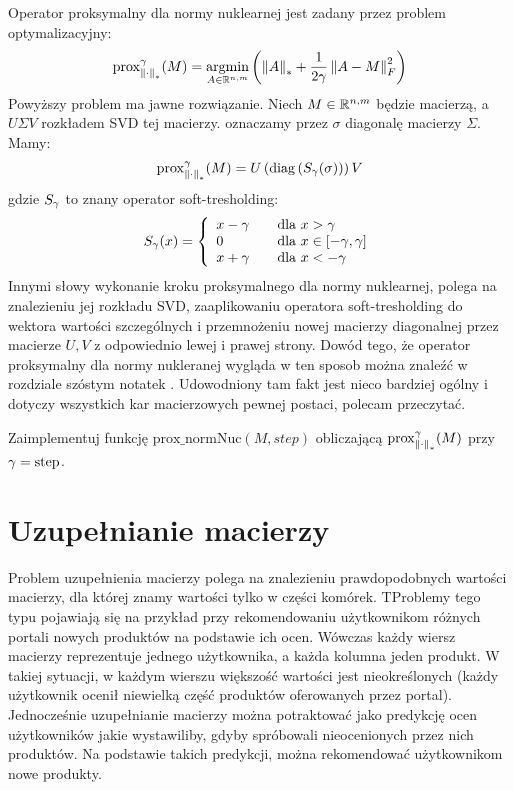 \documentclass[10pt,a4paper,draft]{report}
\begin{document}
Operator proksymalny dla normy nuklearnej jest zadany przez problem optymalizacyjny:
\[
\prox_{\normNuc{\cdot}}^{\step}(M) = \argminl\limits_{A \in \rset^{n,m}} \left(\normNuc{A} + \frac{1}{2\step} \norm{A - M}_F^2 \right)
\]
Powyższy problem ma jawne rozwiązanie. Niech $M \in \mathbb{R}^{n,m}$ będzie macierzą, a $U \Sigma V$ rozkładem SVD tej macierzy. oznaczamy przez $\sigma$ diagonalę macierzy $\Sigma$. Mamy:
\[
\operatorname{prox}_{\left\Vert \cdot \right\Vert_{*}}^{\gamma}(M) = U \left( \operatorname{diag} \left(S_{\gamma}(\sigma) \right) \right) V
\]
gdzie $S_{\gamma}$ to znany operator soft-tresholding:
\[
S_{\gamma}(x) = \left\{ 
\begin{array}{lcl}
x - \gamma && \text{dla } x > \gamma \\
0 &&  \text{dla } x \in [-\gamma, \gamma] \\
x + \gamma && \text{dla } x < -\gamma
\end{array}
\right.
\]
Innymi słowy wykonanie kroku proksymalnego dla normy nuklearnej, polega na znalezieniu jej rozkładu SVD, zaaplikowaniu operatora soft-tresholding do wektora wartości szczególnych i przemnożeniu nowej macierzy diagonalnej przez macierze $U,V$ z odpowiednio lewej i prawej strony. Dowód tego, że operator proksymalny dla normy nukleranej wygląda w ten sposob można znaleźć w rozdziale szóstym notatek \cite{notesMIT}. Udowodniony tam fakt jest nieco bardziej ogólny i dotyczy wszystkich kar macierzowych pewnej postaci, polecam przeczytać.


\begin{problem} \label{prob:prob1} 
Zaimplementuj funkcję $\text{prox\_normNuc}(M, step)$ obliczającą $\operatorname{prox}_{\left\Vert \cdot \right\Vert_{*}}^{\gamma}(M)$ przy $\gamma = \text{step}$.
\end{problem}

\newpage
\section*{Uzupełnianie macierzy}
Problem uzupełnienia macierzy polega na znalezieniu prawdopodobnych wartości macierzy, dla której znamy wartości tylko w części komórek. TProblemy tego typu pojawiają się na przykład przy rekomendowaniu użytkownikom różnych portali nowych produktów na podstawie ich ocen. Wówczas każdy wiersz macierzy reprezentuje jednego użytkownika, a każda kolumna jeden produkt. W takiej sytuacji, w każdym wierszu większość wartości jest nieokreślonych (każdy użytkownik ocenił niewielką część produktów oferowanych przez portal). Jednocześnie uzupełnianie macierzy można potraktować jako predykcję ocen użytkowników jakie wystawiliby, gdyby spróbowali nieocenionych przez nich produktów. Na podstawie takich predykcji, można rekomendować użytkownikom nowe produkty.
\end{document}

